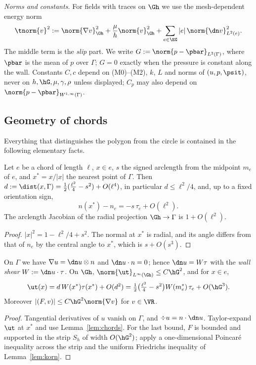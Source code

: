 \emph{Norms and constants.} For fields with traces on $\Gh$ we use the mesh-dependent energy norm
\[
\tnorm{v}^2:=\norm{\nabla v}_{\Oh}^2+\frac{\mu}{h}\norm{v}_{\Gh}^2+\sum_{e\in\EG}|e|\,\norm{\dn v}_{L^2(e)}^2 .
\]
The middle term is the \emph{slip} part. We write $G:=\norm{p-\pbar}_{L^2(\Gamma)}$, where $\pbar$ is the mean of $p$ over $\Gamma$; $G=0$ exactly when the pressure is constant along the wall. Constants $C,c$ depend on (M0)--(M2), $k$, $L$ and norms of $(u,p,\psit)$, never on $h,\hG,\mu,\gamma,\rho$ unless displayed; $C_p$ may also depend on $\norm{p-\pbar}_{W^{1,\infty}(\Gamma)}$.

\subsection{Geometry of chords}
Everything that distinguishes the polygon from the circle is contained in the following elementary facts.

\begin{lemma}[Chords]\label{lem:chords}
Let $e$ be a chord of length $\ell$, $x\in e$, $s$ the signed arclength from the midpoint $m_e$ of $e$, and $x^\ast=x/|x|$ the nearest point of $\Gamma$. Then $d:=\dist(x,\Gamma)=\frac12(\frac{\ell^2}4-s^2)+O(\ell^4)$, in particular $d\le\ell^2/4$, and, up to a fixed orientation sign,
\[
n(x^\ast)-n_e=-s\,\tau_e+O(\ell^2).
\]
The arclength Jacobian of the radial projection $\Gh\to\Gamma$ is $1+O(\ell^2)$.
\end{lemma}

\begin{proof}
$|x|^2=1-\ell^2/4+s^2$. The normal at $x^\ast$ is radial, and its angle differs from that of $n_e$ by the central angle to $x^\ast$, which is $s+O(s^3)$.
\end{proof}

\begin{lemma}\label{lem:wall}
On $\Gamma$ we have $\nabla u=\dn u\otimes n$ and $\dn u\cdot n=0$; hence $\dn u=W\tau$ with the \emph{wall shear} $W:=\dn u\cdot\tau$. On $\Gh$, $\norm{\ut}_{L^\infty(\Gh)}\le C\hG^2$, and for $x\in e$,
\begin{equation}\label{eq:bump}
\ut(x)=d\,W(x^\ast)\tau(x^\ast)+O(d^2)=\tfrac12\bigl(\tfrac{\ell^2}4-s^2\bigr)W(m_e^\ast)\,\tau_e+O(\hG^3).
\end{equation}
Moreover $|(F,v)|\le C\hG^2\norm{\nabla v}$ for $v\in\VR$.
\end{lemma}

\begin{proof}
Tangential derivatives of $u$ vanish on $\Gamma$, and $\div u=n\cdot\dn u$. Taylor-expand $\ut$ at $x^\ast$ and use Lemma~\ref{lem:chords}. For the last bound, $F$ is bounded and supported in the strip $S_h$ of width $O(\hG^2)$; apply a one-dimensional Poincar\'e inequality across the strip and the uniform Friedrichs inequality of Lemma~\ref{lem:korn}.
\end{proof}

